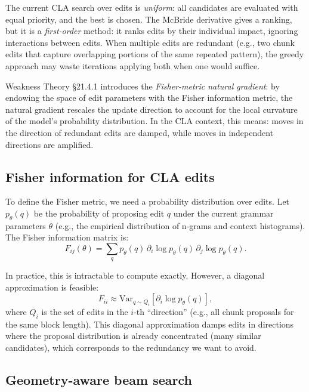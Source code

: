\documentclass[11pt]{article}
\begin{document}
The current CLA search over edits is \emph{uniform}: all candidates are evaluated with equal priority, and the best is chosen.  The McBride derivative gives a ranking, but it is a \emph{first-order} method: it ranks edits by their individual impact, ignoring interactions between edits.  When multiple edits are redundant (e.g., two chunk edits that capture overlapping portions of the same repeated pattern), the greedy approach may waste iterations applying both when one would suffice.

Weakness Theory \S 21.4.1 introduces the \emph{Fisher-metric natural gradient}: by endowing the space of edit parameters with the Fisher information metric, the natural gradient rescales the update direction to account for the local curvature of the model's probability distribution.  In the CLA context, this means: moves in the direction of redundant edits are damped, while moves in independent directions are amplified.

\subsection{Fisher information for CLA edits}

To define the Fisher metric, we need a probability distribution over edits.  Let $p_\theta(q)$ be the probability of proposing edit $q$ under the current grammar parameters $\theta$ (e.g., the empirical distribution of n-grams and context histograms).  The Fisher information matrix is:
\begin{equation}
  F_{ij}(\theta) = \sum_{q} p_\theta(q) \, \partial_i \log p_\theta(q) \, \partial_j \log p_\theta(q).
\end{equation}

In practice, this is intractable to compute exactly.  However, a diagonal approximation is feasible:
\begin{equation}
  F_{ii} \approx \text{Var}_{q \sim Q_i}[\partial_i \log p_\theta(q)],
\end{equation}
where $Q_i$ is the set of edits in the $i$-th ``direction'' (e.g., all chunk proposals for the same block length).  This diagonal approximation damps edits in directions where the proposal distribution is already concentrated (many similar candidates), which corresponds to the redundancy we want to avoid.

\subsection{Geometry-aware beam search}
\end{document}
